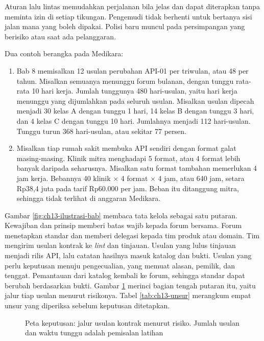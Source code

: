 Aturan lalu lintas memudahkan perjalanan bila jelas dan dapat diterapkan tanpa meminta izin di setiap tikungan. Pengemudi tidak
berhenti untuk bertanya sisi jalan mana yang boleh dipakai. Polisi baru muncul pada persimpangan yang berisiko atau saat ada pelanggaran.

Dua contoh berangka pada Medikara:
\begin{enumerate}
  \item Bab 8 memisalkan 12 usulan perubahan API-01 per triwulan, atau 48 per tahun. Misalkan semuanya menunggu forum bulanan, dengan
        tunggu rata-rata 10 hari kerja. Jumlah tunggunya 480 hari-usulan, yaitu hari kerja menunggu yang dijumlahkan pada seluruh usulan.
        Misalkan usulan dipecah menjadi 30 kelas A dengan tunggu 1 hari, 14 kelas B dengan tunggu 3 hari, dan 4 kelas C dengan tunggu 10
        hari. Jumlahnya menjadi 112 hari-usulan. Tunggu turun 368 hari-usulan, atau sekitar 77 persen.
  \item Misalkan tiap rumah sakit membuka API sendiri dengan format galat masing-masing. Klinik mitra menghadapi 5 format, atau 4 format
        lebih banyak daripada seharusnya. Misalkan satu format tambahan memerlukan 4 jam kerja. Bebannya 40 klinik $\times$ 4 format $\times$
        4 jam, atau 640 jam, setara Rp38,4 juta pada tarif Rp60.000 per jam. Beban itu ditanggung mitra, sehingga tidak terlihat di
        anggaran Medikara.
\end{enumerate}

Gambar \ref{fig:ch13-ilustrasi-bab} membaca tata kelola sebagai satu putaran. Kewajiban dan prinsip memberi batas wajib kepada forum
bersama. Forum menetapkan standar dan memberi delegasi kepada tim produk atau domain. Tim mengirim usulan kontrak ke \textit{lint} dan tinjauan.
Usulan yang lulus tinjauan menjadi rilis API, lalu catatan hasilnya masuk katalog dan bukti. Usulan yang perlu keputusan menuju pengecualian,
yang memuat alasan, pemilik, dan tenggat. Pemantauan dari katalog kembali ke forum, sehingga standar dapat berubah berdasarkan bukti. Gambar
\ref{fig:ch13-peta-keputusan} merinci bagian tengah putaran itu, yaitu jalur tiap usulan menurut risikonya. Tabel \ref{tab:ch13-unsur}
merangkum empat unsur yang diperiksa sebelum keputusan ditetapkan.

\begin{figure}[!htb]
  \centering
  
  \caption{Peta keputusan: jalur usulan kontrak menurut risiko. Jumlah usulan dan waktu tunggu adalah pemisalan latihan}
  \label{fig:ch13-peta-keputusan}
\end{figure}

